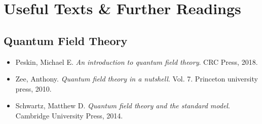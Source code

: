 \chapter*{Useful Texts \& Further Readings}

\section*{Quantum Field Theory}
\begin{itemize}
    \item Peskin, Michael E. \textit{An introduction to quantum field theory}. CRC Press, 2018.
    \item Zee, Anthony. \textit{Quantum field theory in a nutshell}. Vol. 7. Princeton university press, 2010.
    \item Schwartz, Matthew D. \textit{Quantum field theory and the standard model}. Cambridge University Press, 2014.
\end{itemize}

